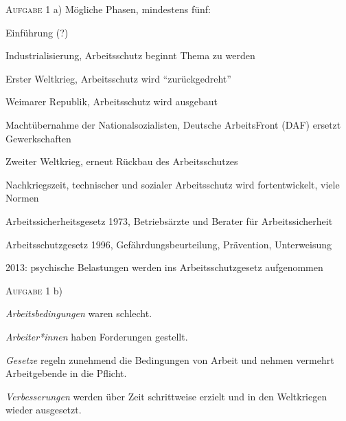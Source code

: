 \textsc{Aufgabe 1} a) \quad Mögliche Phasen, mindestens fünf: 
\begin{myenumerate}
    \item Einführung (?)
    \item Industrialisierung, Arbeitsschutz beginnt Thema zu werden %

    \item Erster Weltkrieg, Arbeitsschutz wird \enquote{zurückgedreht}
    \item Weimarer Republik, Arbeitsschutz wird ausgebaut
    \item Machtübernahme der Nationalsozialisten, Deutsche ArbeitsFront (DAF) ersetzt Gewerkschaften
    \item Zweiter Weltkrieg, erneut Rückbau des Arbeitsschutzes
    \item Nachkriegszeit, technischer und sozialer Arbeitsschutz wird fortentwickelt, viele Normen
    \item Arbeitssicherheitsgesetz 1973, Betriebsärzte und Berater für Arbeitssicherheit 
    \item Arbeitsschutzgesetz 1996, Gefährdungsbeurteilung, Prävention, Unterweisung
    \item 2013: psychische Belastungen werden ins Arbeitsschutzgesetz aufgenommen
\end{myenumerate}

\textsc{Aufgabe 1} b) \quad
\begin{myitemize}
    \item \emph{Arbeitsbedingungen} waren schlecht.
    \item \emph{Arbeiter*innen} haben Forderungen gestellt.
    \item \emph{Gesetze} regeln zunehmend die Bedingungen von Arbeit und nehmen vermehrt Arbeitgebende in die Pflicht. 
    \item \emph{Verbesserungen} werden über Zeit schrittweise erzielt und in den Weltkriegen wieder ausgesetzt. 
\end{myitemize}


